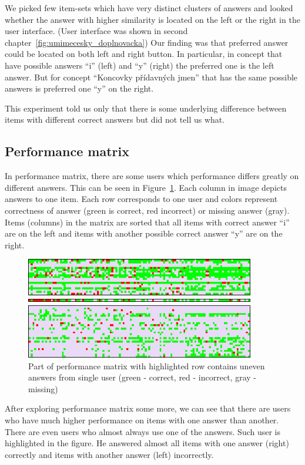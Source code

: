 \documentclass[
  printed, %
  table,   %
  nolof,     %
  nolot,     %
  color,
  final,
  nocover
]{fithesis3}
\begin{document}
We picked few item-sets which have very distinct clusters of answers and looked whether the answer with higher similarity is located on the left or the right in the user interface. (User interface was shown in second chapter~\ref{fig:umimecesky_doplnovacka}) Our finding was that preferred answer could be located on both left and right button. In particular, in concept \cviceniB{} that have possible answers ``i'' (left) and ``y'' (right) the preferred one is the left answer. But for concept ``Koncovky přídavných jmen'' that has the same possible answers is preferred one ``y'' on the right.

This experiment told us only that there is some underlying difference between items with different correct answers but did not tell us what.


\subsection{Performance matrix}\label{performance-matrix}

In performance matrix, there are some users which performance differs greatly on different answers. This can be seen in Figure~\ref{fig:performance_matrix}. Each column in image depicts answers to one item. Each row corresponds to one user and colors represent correctness of answer (green is correct, red incorrect) or missing answer (gray). Items (columns) in the matrix are sorted that all items with correct answer ``i'' are on the left and items with another possible correct answer ``y'' are on the right.

\begin{figure}
  \includegraphics[width=10cm]{img/performance_matrix}
  \caption{Part of performance matrix with highlighted row contains uneven answers from single user (green - correct, red - incorrect, gray - missing)}
  \label{fig:performance_matrix}
\end{figure}

After exploring performance matrix some more, we can see that there are users who have much higher performance on items with one answer than another. There are even users who almost always use one of the answers. Such user is highlighted in the figure. He answered almost all items with one answer (right) correctly and items with another answer (left) incorrectly.
\end{document}
